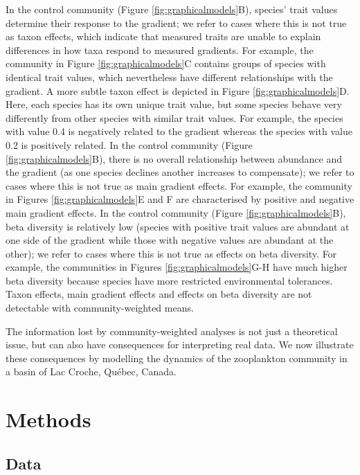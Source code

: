 \documentclass[12pt]{ecology}
\begin{document}
In the control community (Figure \ref{fig:graphicalmodels}B), species' trait values determine their response to the gradient; we refer to cases where this is not true as taxon effects, which indicate that measured traits are unable to explain differences in how taxa respond to measured gradients.  For example, the community in Figure \ref{fig:graphicalmodels}C contains groups of species with identical trait values, which nevertheless have different relationships with the gradient.  A more subtle taxon effect is depicted in Figure \ref{fig:graphicalmodels}D.  Here, each species has its own unique trait value, but some species behave very differently from other species with similar trait values.  For example, the species with value 0.4 is negatively related to the gradient whereas the species with value 0.2 is positively related.  In the control community (Figure \ref{fig:graphicalmodels}B), there is no overall relationship between abundance and the gradient (as one species declines another increases to compensate); we refer to cases where this is not true as main gradient effects.  For example, the community in Figures \ref{fig:graphicalmodels}E and F are characterised by positive and negative main gradient effects.  In the control community (Figure \ref{fig:graphicalmodels}B), beta diversity is relatively low (species with positive trait values are abundant at one side of the gradient while those with negative values are abundant at the other); we refer to cases where this is not true as effects on beta diversity.  For example, the communities in Figures \ref{fig:graphicalmodels}G-H have much higher beta diversity because species have more restricted environmental tolerances.  Taxon effects, main gradient effects and effects on beta diversity are not detectable with community-weighted means.

The information lost by community-weighted analyses is not just a theoretical issue, but can also have consequences for interpreting real data.  We now illustrate these consequences by modelling the dynamics of the zooplankton community in a basin of Lac Croche, Qu\'{e}bec, Canada.

\section{Methods}

\subsection{Data}
\end{document}
